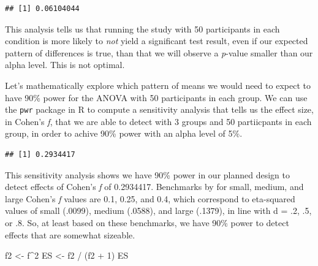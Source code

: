 \documentclass[
]{book}
\newenvironment{Shaded}{\begin{snugshade}}{\end{snugshade}}
\newcommand{\AttributeTok}[1]{\textcolor[rgb]{0.77,0.63,0.00}{#1}}
\newcommand{\CommentTok}[1]{\textcolor[rgb]{0.56,0.35,0.01}{\textit{#1}}}
\newcommand{\DecValTok}[1]{\textcolor[rgb]{0.00,0.00,0.81}{#1}}
\newcommand{\FloatTok}[1]{\textcolor[rgb]{0.00,0.00,0.81}{#1}}
\newcommand{\FunctionTok}[1]{\textcolor[rgb]{0.00,0.00,0.00}{#1}}
\newcommand{\NormalTok}[1]{#1}
\newcommand{\OtherTok}[1]{\textcolor[rgb]{0.56,0.35,0.01}{#1}}
\newcommand{\SpecialCharTok}[1]{\textcolor[rgb]{0.00,0.00,0.00}{#1}}
\begin{document}
\begin{verbatim}
## [1] 0.06104044
\end{verbatim}

This analysis tells us that running the study with 50 participants in each condition is more likely to \emph{not} yield a significant test result, even if our expected pattern of differences is true, than that we will observe a \emph{p}-value smaller than our alpha level. This is not optimal.

Let's mathematically explore which pattern of means we would need to expect to have 90\% power for the ANOVA with 50 participants in each group. We can use the \texttt{pwr} package in R to compute a sensitivity analysis that tells us the effect size, in Cohen's \emph{f}, that we are able to detect with 3 groups and 50 partiicpants in each group, in order to achive 90\% power with an alpha level of 5\%.

\begin{Shaded}
\end{Shaded}

\begin{verbatim}
## [1] 0.2934417
\end{verbatim}

This sensitivity analysis shows we have 90\% power in our planned design to detect effects of Cohen's \emph{f} of 0.2934417. Benchmarks by \citet{cohen1988spa} for small, medium, and large Cohen's \emph{f} values are 0.1, 0.25, and 0.4, which correspond to eta-squared values of small (.0099), medium (.0588), and large (.1379), in line with d = .2, .5, or .8. So, at least based on these benchmarks, we have 90\% power to detect effects that are somewhat sizeable.

\begin{Shaded}
\begin{Highlighting}[]
\NormalTok{f2 }\OtherTok{\textless{}{-}}\NormalTok{ f}\SpecialCharTok{\^{}}\DecValTok{2}
\NormalTok{ES }\OtherTok{\textless{}{-}}\NormalTok{ f2 }\SpecialCharTok{/}\NormalTok{ (f2 }\SpecialCharTok{+} \DecValTok{1}\NormalTok{)}
\NormalTok{ES}
\end{Highlighting}
\end{Shaded}
\end{document}
